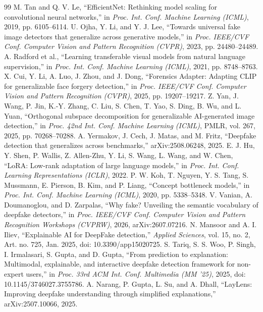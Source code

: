 \begin{thebibliography}{99}
 M. Tan and Q. V. Le, ``EfficientNet: Rethinking model scaling for convolutional neural networks,'' in \emph{Proc. Int. Conf. Machine Learning (ICML)}, 2019, pp. 6105--6114.
 U. Ojha, Y. Li, and Y. J. Lee, ``Towards universal fake image detectors that generalize across generative models,'' in \emph{Proc. IEEE/CVF Conf. Computer Vision and Pattern Recognition (CVPR)}, 2023, pp. 24480--24489.
 A. Radford et al., ``Learning transferable visual models from natural language supervision,'' in \emph{Proc. Int. Conf. Machine Learning (ICML)}, 2021, pp. 8748--8763.
 X. Cui, Y. Li, A. Luo, J. Zhou, and J. Dong, ``Forensics Adapter: Adapting CLIP for generalizable face forgery detection,'' in \emph{Proc. IEEE/CVF Conf. Computer Vision and Pattern Recognition (CVPR)}, 2025, pp. 19207--19217.
 Z. Yan, J. Wang, P. Jin, K.-Y. Zhang, C. Liu, S. Chen, T. Yao, S. Ding, B. Wu, and L. Yuan, ``Orthogonal subspace decomposition for generalizable AI-generated image detection,'' in \emph{Proc. 42nd Int. Conf. Machine Learning (ICML)}, PMLR, vol. 267, 2025, pp. 70268--70288.
 A. Yermakov, J. Cech, J. Matas, and M. Fritz, ``Deepfake detection that generalizes across benchmarks,'' arXiv:2508.06248, 2025.
 E. J. Hu, Y. Shen, P. Wallis, Z. Allen-Zhu, Y. Li, S. Wang, L. Wang, and W. Chen, ``LoRA: Low-rank adaptation of large language models,'' in \emph{Proc. Int. Conf. Learning Representations (ICLR)}, 2022.
 P. W. Koh, T. Nguyen, Y. S. Tang, S. Mussmann, E. Pierson, B. Kim, and P. Liang, ``Concept bottleneck models,'' in \emph{Proc. Int. Conf. Machine Learning (ICML)}, 2020, pp. 5338--5348.
 V. Vanian, A. Doumanoglou, and D. Zarpalas, ``Why fake? Unveiling the semantic vocabulary of deepfake detectors,'' in \emph{Proc. IEEE/CVF Conf. Computer Vision and Pattern Recognition Workshops (CVPRW)}, 2026, arXiv:2607.07216.
 N. Mansoor and A. I. Iliev, ``Explainable AI for DeepFake detection,'' \emph{Applied Sciences}, vol. 15, no. 2, Art. no. 725, Jan. 2025, doi: 10.3390/app15020725.
 S. Tariq, S. S. Woo, P. Singh, I. Irmalasari, S. Gupta, and D. Gupta, ``From prediction to explanation: Multimodal, explainable, and interactive deepfake detection framework for non-expert users,'' in \emph{Proc. 33rd ACM Int. Conf. Multimedia (MM '25)}, 2025, doi: 10.1145/3746027.3755786.
 A. Narang, P. Gupta, L. Su, and A. Dhall, ``LayLens: Improving deepfake understanding through simplified explanations,'' arXiv:2507.10066, 2025.

\end{thebibliography}
